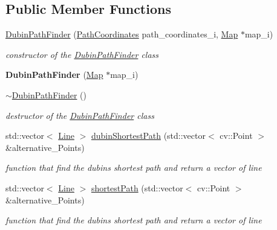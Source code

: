 \subsection*{Public Member Functions}
\begin{DoxyCompactItemize}
\item 
\mbox{\hyperlink{class_path2_d_1_1_dubin_path_finder_a663ec1b97f56c4a36cbe242752d1253a}{Dubin\+Path\+Finder}} (\mbox{\hyperlink{class_path2_d_1_1_element_1_1_path_coordinates}{Path\+Coordinates}} path\+\_\+coordinates\+\_\+i, \mbox{\hyperlink{class_map}{Map}} $\ast$map\+\_\+i)
\begin{DoxyCompactList}\small\item\em constructor of the \mbox{\hyperlink{class_path2_d_1_1_dubin_path_finder}{Dubin\+Path\+Finder}} class \end{DoxyCompactList}\item 
\mbox{\label{class_path2_d_1_1_dubin_path_finder_aa7bc3ba033b48ad8657e9c20b33c8f50}} 
{\bfseries Dubin\+Path\+Finder} (\mbox{\hyperlink{class_map}{Map}} $\ast$map\+\_\+i)
\item 
\mbox{\label{class_path2_d_1_1_dubin_path_finder_a053bc3ec20cfaf50927f055f2b0964d8}} 
\mbox{\hyperlink{class_path2_d_1_1_dubin_path_finder_a053bc3ec20cfaf50927f055f2b0964d8}{$\sim$\+Dubin\+Path\+Finder}} ()
\begin{DoxyCompactList}\small\item\em destructor of the \mbox{\hyperlink{class_path2_d_1_1_dubin_path_finder}{Dubin\+Path\+Finder}} class \end{DoxyCompactList}\item 
std\+::vector$<$ \mbox{\hyperlink{class_path2_d_1_1_element_1_1_line}{Line}} $>$ \mbox{\hyperlink{class_path2_d_1_1_dubin_path_finder_abc1e93ad55c02aec66807fea41729ff6}{dubin\+Shortest\+Path}} (std\+::vector$<$ cv\+::\+Point $>$ \&alternative\+\_\+\+Points)
\begin{DoxyCompactList}\small\item\em function that find the dubins shortest path and return a vector of line \end{DoxyCompactList}\item 
std\+::vector$<$ \mbox{\hyperlink{class_path2_d_1_1_element_1_1_line}{Line}} $>$ \mbox{\hyperlink{class_path2_d_1_1_dubin_path_finder_a53d6ee86e364b403274f403af6e5088e}{shortest\+Path}} (std\+::vector$<$ cv\+::\+Point $>$ \&alternative\+\_\+\+Points)
\begin{DoxyCompactList}\small\item\em function that find the dubins shortest path and return a vector of line \end{DoxyCompactList}\end{DoxyCompactItemize}
